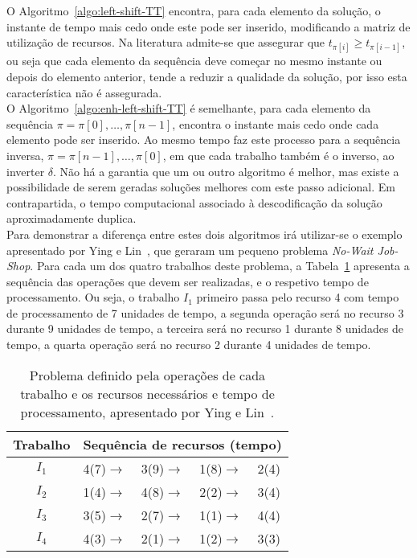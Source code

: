 O Algoritmo~\ref{algo:left-shift-TT} encontra, para cada elemento da solução, o instante de tempo mais cedo onde este pode ser inserido, modificando a matriz de utilização de recursos. Na literatura admite-se que assegurar que $t_{\pi[i]} \geq t_{\pi[i-1]}$, ou seja que cada elemento da sequência deve começar no mesmo instante ou depois do elemento anterior, tende a reduzir a qualidade da solução, por isso esta característica não é assegurada.\\
O Algoritmo~\ref{algo:enh-left-shift-TT} é semelhante, para cada elemento da sequência $\pi=\pi[0],\ldots, \pi[n-1]$, encontra o instante mais cedo onde cada elemento pode ser inserido. Ao mesmo tempo faz este processo para a sequência inversa, $\pi=\pi[n-1],\ldots, \pi[0]$, em que cada trabalho também é o inverso, ao inverter $\delta$. Não há a garantia que um ou outro algoritmo é melhor, mas existe a possibilidade de serem geradas soluções melhores com este passo adicional. Em contrapartida, o tempo computacional associado à descodificação da solução aproximadamente duplica.\\

Para demonstrar a diferença entre estes dois algoritmos irá utilizar-se o exemplo apresentado por Ying e Lin~\cite{yingSolvingNowaitJobshop2020}, que geraram um pequeno problema \textit{No-Wait Job-Shop}. Para cada um dos quatro trabalhos deste problema, a Tabela~\ref{tab:P1M2_GV_examp} apresenta a sequência das operações que devem ser realizadas, e o respetivo tempo de processamento. Ou seja, o trabalho $I_{1}$ primeiro passa pelo recurso 4 com tempo de processamento de 7 unidades de tempo, a segunda operação será no recurso 3 durante 9 unidades de tempo, a terceira será no recurso 1 durante 8 unidades de tempo, a quarta operação será no recurso 2 durante 4 unidades de tempo.\\

\begin{table}[H]
\caption{Problema definido pela operações de cada trabalho e os recursos necessários e tempo de processamento, apresentado por Ying e Lin~\cite{yingSolvingNowaitJobshop2020}.}
\label{tab:niveis_P1}
\centering
\begin{tabular}{c|llll}
Trabalho & \multicolumn{4}{c}{Sequência de recursos (tempo)} \\ \hline
$I_{1}$  & 4(7)$\to$ & 3(9)$\to$ & 1(8)$\to$ & 2(4)          \\
$I_{2}$  & 1(4)$\to$ & 4(8)$\to$ & 2(2)$\to$ & 3(4)          \\
$I_{3}$  & 3(5)$\to$ & 2(7)$\to$ & 1(1)$\to$ & 4(4)          \\
$I_{4}$  & 4(3)$\to$ & 2(1)$\to$ & 1(2)$\to$ & 3(3)
\end{tabular}
\label{tab:P1M2_GV_examp}
\end{table}

